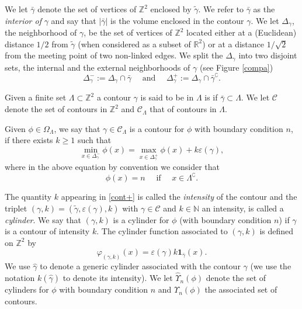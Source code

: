 \documentclass[JEP,XML,SOM,Unicode, NoFloatCountersInSection]{cedram}
\let\mathcal\mathscr
\numberwithin{equation}{section}
\theoremstyle{plain}
\theoremstyle{definition}
\newcommand{\ind}{\mathbf{1}}
\newcommand{\cc}{\complement}
\newcommand{\cC}{{\ensuremath{\mathcal C}} }
\newcommand{\bbN}{{\ensuremath{\mathbb N}} }
\newcommand{\bbR}{{\ensuremath{\mathbb R}} }
\newcommand{\bbZ}{{\ensuremath{\mathbb Z}} }
\newcommand{\gep}{\varepsilon}
\newcommand{\gO}{\Omega}
\newcommand{\gL}{\Lambda}
\begin{document}
We let $\bar \gamma$ denote the set of vertices of $\bbZ^2$ enclosed by $\tilde \gamma$.
We refer to $\bar \gamma$ as the \emph{interior of} $\gamma$ and say that $|\bar \gamma|$ is the volume enclosed in the contour $\gamma$.
We let $\Delta_{\gamma}$, the neighborhood of $\gamma$, be the set of vertices of $\bbZ^2$ located either at a (Euclidean) distance $1/2$ from
$\tilde\gamma$
(when considered as a subset of $\bbR^2$)
or at a distance $1/\sqrt{2}$ from the meeting point of two non-linked edges.
We split the $\Delta_{\gamma}$ into two disjoint sets, the internal and the external neighborhoods of $\gamma$
(see Figure \ref{compa})
\[
\Delta^-_{\gamma}:=\Delta_{\gamma}\cap \bar \gamma \quad \text{ and } \quad \Delta^+_{\gamma}:=\Delta_{\gamma}\cap \bar \gamma^{\cc}.
\]

Given a finite set $\gL\subset \bbZ^2$
a contour $\gamma$ is said to be in $\gL$ is if $\bar \gamma\subset \gL$.
We let $\cC$ denote the set of contours in $\bbZ^2$ and $\cC_{\gL}$ that of contours in $\gL$.

Given $\phi\in \gO_{\gL}$, we say that $\gamma \in \cC_{\gL}$ is a contour
for $\phi$ with boundary condition $n$, if there exists $k\ge 1$ such that
\begin{equation}\label{cont+}
\min_{x\in \Delta^-_{\gamma}} \phi(x)= \max_{x\in \Delta^+_{\gamma}} \phi(x)+k\gep(\gamma),
\end{equation}
where in the above equation by convention we consider that
\[
\phi(x)=n \quad \text{ if } \quad x\in \gL^{\cc}.
\]

The quantity $k$ appearing in \eqref{cont+} is called the \textit{intensity} of the contour and the
triplet $(\gamma,k)=(\tilde \gamma, \gep(\gamma), k)$
with $\gamma \in \cC$ and $k\in \bbN$ an intensity, is called a \textit{cylinder}. We say that $(\gamma,k)$
is a cylinder for $\phi$ (with boundary condition $n$) if $\gamma$ is a contour of intensity $k$.
The cylinder function associated to $(\gamma,k)$ is defined on $\bbZ^2$ by
\begin{equation}\label{cylfunc}
\varphi_{(\gamma,k)}(x)=\gep(\gamma) k \ind_{\bar \gamma}(x).
\end{equation}
We use $\hat \gamma$ to denote a generic cylinder associated with the contour $\gamma$ (we use the notation $k(\hat \gamma)$ to denote its intensity).
We let $\hat \Upsilon_n(\phi)$ denote the set of cylinders for $\phi$ with boundary condition $n$ and $\Upsilon_n(\phi)$ the associated set of contours.
\end{document}
